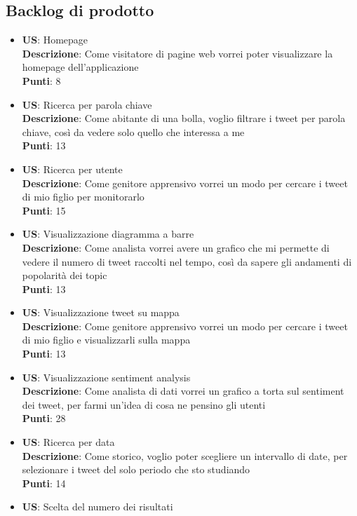 \documentclass{article}
\begin{document}
\subsection{Backlog di prodotto}
\begin{itemize}
    \item \textbf{US}: Homepage \\
    \textbf{Descrizione}: Come visitatore di pagine web vorrei poter visualizzare la homepage dell'applicazione \\
    \textbf{Punti}: 8
    \item \textbf{US}: Ricerca per parola chiave \\
    \textbf{Descrizione}: Come abitante di una bolla, voglio filtrare i tweet per parola chiave, così da vedere solo quello che interessa a me \\
    \textbf{Punti}: 13
    \item \textbf{US}: Ricerca per utente \\
    \textbf{Descrizione}: Come genitore apprensivo vorrei un modo per cercare i tweet di mio figlio per monitorarlo \\
    \textbf{Punti}: 15
    \item \textbf{US}: Visualizzazione diagramma a barre \\
    \textbf{Descrizione}: Come analista vorrei avere un grafico che mi permette di vedere il numero di tweet raccolti nel tempo, così da sapere gli andamenti di popolarità dei topic \\
    \textbf{Punti}: 13
    \item \textbf{US}: Visualizzazione tweet su mappa \\
    \textbf{Descrizione}: Come genitore apprensivo vorrei un modo per cercare i tweet di mio figlio e visualizzarli sulla mappa \\
    \textbf{Punti}: 13
    \item \textbf{US}: Visualizzazione sentiment analysis \\
    \textbf{Descrizione}: Come analista di dati vorrei un grafico a torta sul sentiment dei tweet, per farmi un'idea di cosa ne pensino gli utenti \\
    \textbf{Punti}: 28
    \item \textbf{US}: Ricerca per data \\
    \textbf{Descrizione}: Come storico, voglio poter scegliere un intervallo di date, per selezionare i tweet del solo periodo che sto studiando \\
    \textbf{Punti}: 14
    \item \textbf{US}: Scelta del numero dei risultati \\

\end{itemize}
\end{document}
